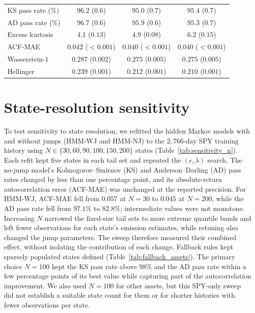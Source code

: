 \begin{table}[H]
\begin{tabular}{@{}lccc@{}}
KS pass rate (\%)   & $\mathbf{96.2}$ ($0.6$) &  $95.0$ ($0.7$)         &  $95.4$ ($0.7$) \\
AD pass rate (\%)   & $\mathbf{96.7}$ ($0.6$) &  $95.9$ ($0.6$)         &  $95.3$ ($0.7$) \\
Excess kurtosis     &   $4.1$ ($0.13$)        &   $4.9$ ($0.08$)        & $\mathbf{6.2}$ ($0.15$) \\
ACF-MAE             & $0.042$ ($<\!0.001$)    & $\mathbf{0.040}$ ($<\!0.001$) & $\mathbf{0.040}$ ($<\!0.001$) \\
Wasserstein-$1$     & $0.287$ ($0.002$)       & $\mathbf{0.275}$ ($0.005$) & $\mathbf{0.275}$ ($0.005$) \\
Hellinger           & $0.239$ ($0.001$)       & $0.212$ ($0.001$)       & $\mathbf{0.210}$ ($0.001$) \\
\bottomrule
\end{tabular}
\end{table}


\section{State-resolution sensitivity}
\label{sec:supp-sensitivity}

To test sensitivity to state resolution, we refitted the hidden
Markov models with and without jumps (HMM-WJ and HMM-NJ) to the
$2{,}766$-day SPY training history using
$N\in\{30,60,90,100,150,200\}$ states
(Table~\ref{tab:sensitivity_n}). Each refit kept five states in each
tail set and repeated the $(\epsilon,\lambda)$ search. The no-jump model's
Kolmogorov--Smirnov (KS) and Anderson--Darling (AD) pass rates changed
by less than one percentage point, and its absolute-return
autocorrelation error (ACF-MAE) was unchanged at the reported
precision. For HMM-WJ, ACF-MAE fell from $0.057$ at $N=30$ to
$0.045$ at $N=200$, while the AD pass rate fell from $97.1\%$ to
$82.8\%$; intermediate values were not monotone. Increasing $N$
narrowed the fixed-size tail sets to more extreme quantile bands and
left fewer observations for each state's emission estimates, while
retuning also changed the jump parameters. The sweep therefore
measured their combined effect, without isolating the contribution of
each change. Fallback rules kept sparsely populated states defined
(Table~\ref{tab:fallback_assets}). The primary choice $N=100$ kept
the KS pass rate above $98\%$ and the AD pass rate within a few
percentage points of its best value while capturing part of the
autocorrelation improvement. We also used $N=100$ for other assets,
but this SPY-only sweep did not establish a suitable state count for
them or for shorter histories with fewer observations per state.

